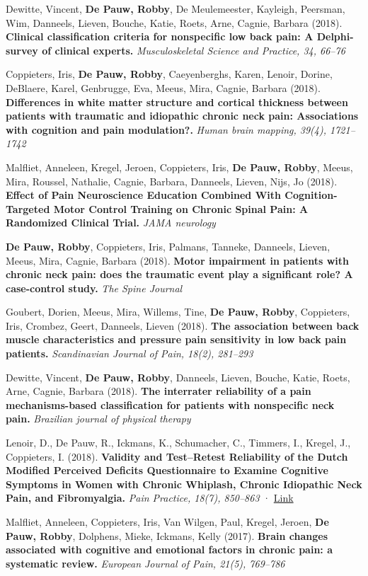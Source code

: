 \documentclass[
  letterpaper,
  DIV=11,
  numbers=noendperiod]{scrartcl}
\begin{document}
Dewitte, Vincent, \textbf{De Pauw, Robby}, De Meulemeester, Kayleigh,
Peersman, Wim, Danneels, Lieven, Bouche, Katie, Roets, Arne, Cagnie,
Barbara (2018). \textbf{Clinical classification criteria for nonspecific
low back pain: A Delphi-survey of clinical experts.}
\emph{Musculoskeletal Science and Practice, 34, 66--76}

Coppieters, Iris, \textbf{De Pauw, Robby}, Caeyenberghs, Karen, Lenoir,
Dorine, DeBlaere, Karel, Genbrugge, Eva, Meeus, Mira, Cagnie, Barbara
(2018). \textbf{Differences in white matter structure and cortical
thickness between patients with traumatic and idiopathic chronic neck
pain: Associations with cognition and pain modulation?.} \emph{Human
brain mapping, 39(4), 1721--1742}

Malfliet, Anneleen, Kregel, Jeroen, Coppieters, Iris, \textbf{De Pauw,
Robby}, Meeus, Mira, Roussel, Nathalie, Cagnie, Barbara, Danneels,
Lieven, Nijs, Jo (2018). \textbf{Effect of Pain Neuroscience Education
Combined With Cognition-Targeted Motor Control Training on Chronic
Spinal Pain: A Randomized Clinical Trial.} \emph{JAMA neurology}

\textbf{De Pauw, Robby}, Coppieters, Iris, Palmans, Tanneke, Danneels,
Lieven, Meeus, Mira, Cagnie, Barbara (2018). \textbf{Motor impairment in
patients with chronic neck pain: does the traumatic event play a
significant role? A case-control study.} \emph{The Spine Journal}

Goubert, Dorien, Meeus, Mira, Willems, Tine, \textbf{De Pauw, Robby},
Coppieters, Iris, Crombez, Geert, Danneels, Lieven (2018). \textbf{The
association between back muscle characteristics and pressure pain
sensitivity in low back pain patients.} \emph{Scandinavian Journal of
Pain, 18(2), 281--293}

Dewitte, Vincent, \textbf{De Pauw, Robby}, Danneels, Lieven, Bouche,
Katie, Roets, Arne, Cagnie, Barbara (2018). \textbf{The interrater
reliability of a pain mechanisms-based classification for patients with
nonspecific neck pain.} \emph{Brazilian journal of physical therapy}

Lenoir, D., De Pauw, R., Ickmans, K., Schumacher, C., Timmers, I.,
Kregel, J., Coppieters, I. (2018). \textbf{Validity and Test--Retest
Reliability of the Dutch Modified Perceived Deficits Questionnaire to
Examine Cognitive Symptoms in Women with Chronic Whiplash, Chronic
Idiopathic Neck Pain, and Fibromyalgia.} \emph{Pain Practice, 18(7),
850--863} · \href{http://dx.doi.org/10.1111/PAPR.12683}{Link}

Malfliet, Anneleen, Coppieters, Iris, Van Wilgen, Paul, Kregel, Jeroen,
\textbf{De Pauw, Robby}, Dolphens, Mieke, Ickmans, Kelly (2017).
\textbf{Brain changes associated with cognitive and emotional factors in
chronic pain: a systematic review.} \emph{European Journal of Pain,
21(5), 769--786}
\end{document}

